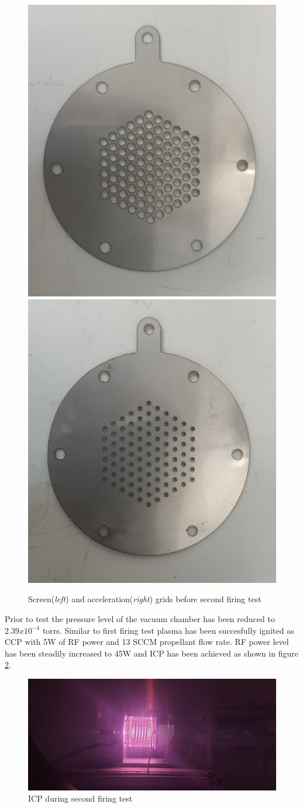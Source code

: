 \begin{figure}[ht]
    \centering
    \includegraphics[width=0.4\linewidth]{fig/deneme2/test2_screen_before.jpg}
    \includegraphics[width=0.41\linewidth]{fig/deneme2/test2_accel_before.jpg}
    \caption{Screen(\textit{left}) and acceleration(\textit{right}) grids before second firing test}
    \label{fig:2nd_grids_before}
\end{figure}

Prior to test the pressure level of the vacuum chamber has been reduced to $2.39x10^{-4}$ torrs. Similar to first firing test plasma has been succesfully ignited as CCP with 5W of RF power and 13 SCCM propellant flow rate. RF power level has been steadily increased to 45W and ICP has been achieved as shown in figure \ref{fig:2nd_icp}. 

\begin{figure}[ht]
    \centering
    \includegraphics[width=\linewidth]{fig/deneme2/test2_icpglow.jpg}
    \caption{ICP during second firing test}
    \label{fig:2nd_icp}
\end{figure}

